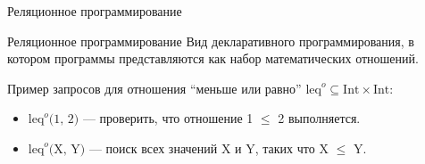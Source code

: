 \documentclass[xcolor=table]{beamer}
\begin{document}
\begin{frame}{Реляционное программирование}
  \begin{block}{Реляционное программирование}
      Вид декларативного программирования, в котором программы
      представляются как набор математических отношений.
  \end{block}
   \vspace{0.4cm}
   \begin{block}{}
   Пример запросов для отношения ``меньше или равно'' $\text{leq}^o \subseteq \text{Int} \times \text{Int}$:
   \begin{itemize}
   \item $\text{leq}^o\text{(1, 2)}$ --- проверить, что отношение 1 $\leq$ 2 выполняется. %
   \item $\text{leq}^o\text{(X, Y)}$ --- поиск всех значений X и Y, таких что X $\leq$ Y.
   \end{itemize}
   \end{block}

\end{frame}
\end{document}
